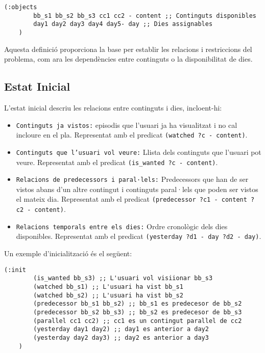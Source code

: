 \documentclass[a4paper]{article}
\begin{document}
	\begin{lstlisting}[language=PDDL, caption={Definició d'objectes}, label={lst:def_objectes}]
	(:objects
		bb_s1 bb_s2 bb_s3 cc1 cc2 - content ;; Continguts disponibles
		day1 day2 day3 day4 day5- day ;; Dies assignables
	)
	\end{lstlisting}
	
	Aquesta definició proporciona la base per establir les relacions i restriccions del problema, com ara les dependències entre continguts o la disponibilitat de dies.
	
	\subsection{Estat Inicial}
	
	L'estat inicial descriu les relacions entre continguts i dies, incloent-hi:
	
	\begin{itemize}
		\item \texttt{Continguts ja vistos:} episodis que l'usuari ja ha visualitzat i no cal incloure en el pla. Representat amb el predicat \texttt{(watched ?c - content)}.
		\item \texttt{Continguts que l'usuari vol veure:} Llista dels continguts que l'usuari pot veure. Representat amb el predicat \texttt{(is\_wanted ?c - content)}.
		\item \texttt{Relacions de predecessors i paral·lels:} Predecessors que han de ser vistos abans d’un altre contingut i continguts paral·lels que poden ser vistos el mateix dia. Representat amb el predicat \texttt{(predecessor ?c1 - content ?c2 - content)}.
		\item \texttt{Relacions temporals entre els dies:} Ordre cronològic dels dies disponibles. Representat amb el predicat \texttt{(yesterday ?d1 - day ?d2 - day)}.
	\end{itemize}
	
	Un exemple d'inicialització és el següent:
	
	\begin{lstlisting}[language=PDDL, caption={Exemple d'inicialització del problema}, label={lst:ini_problema}]
	(:init
		(is_wanted bb_s3) ;; L'usuari vol visiionar bb_s3
		(watched bb_s1) ;; L'usuari ha vist bb_s1
		(watched bb_s2) ;; L'usuari ha vist bb_s2
		(predecessor bb_s1 bb_s2) ;; bb_s1 es predecesor de bb_s2
		(predecessor bb_s2 bb_s3) ;; bb_s2 es predecesor de bb_s3
		(parallel cc1 cc2) ;; cc1 es un contingut parallel de cc2
		(yesterday day1 day2) ;; day1 es anterior a day2
		(yesterday day2 day3) ;; day2 es anterior a day3
	)
	\end{lstlisting}
	
\end{document}
